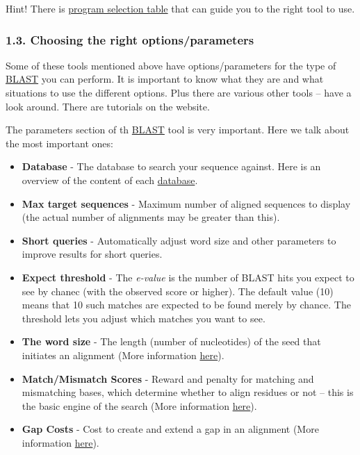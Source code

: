 \documentclass[]{article}
\begin{document}
Hint! There is
\href{http://blast.ncbi.nlm.nih.gov/Blast.cgi?CMD=Web\&PAGE_TYPE=BlastDocs\&DOC_TYPE=ProgSelectionGuide\#pstab}{program
selection table} that can guide you to the right tool to use.

\subsubsection{1.3. Choosing the right
options/parameters}\label{choosing-the-right-optionsparameters}

Some of these tools mentioned above have options/parameters for the type
of \href{http://blast.ncbi.nlm.nih.gov/}{BLAST} you can perform. It is
important to know what they are and what situations to use the different
options. Plus there are various other tools -- have a look around. There
are tutorials on the website.

The parameters section of th
\href{http://blast.ncbi.nlm.nih.gov/}{BLAST} tool is very important.
Here we talk about the most important ones:

\begin{itemize}
\itemsep1pt\parskip0pt
\item
  \textbf{Database} - The database to search your sequence against. Here
  is an overview of the content of each
  \href{http://blast.ncbi.nlm.nih.gov/Blast.cgi?CMD=Web\&PAGE_TYPE=BlastDocs\&DOC_TYPE=ProgSelectionGuide\#db}{database}.
\item
  \textbf{Max target sequences} - Maximum number of aligned sequences to
  display (the actual number of alignments may be greater than this).
\item
  \textbf{Short queries} - Automatically adjust word size and other
  parameters to improve results for short queries.
\item
  \textbf{Expect threshold} - The \emph{e-value} is the number of BLAST
  hits you expect to see by chanec (with the observed score or higher).
  The default value (10) means that 10 such matches are expected to be
  found merely by chance. The threshold lets you adjust which matches
  you want to see.
\item
  \textbf{The word size} - The length (number of nucleotides) of the
  seed that initiates an alignment (More information
  \href{http://www.ncbi.nlm.nih.gov/BLAST/blastcgihelp.shtml\#wordsize}{here}).
\item
  \textbf{Match/Mismatch Scores} - Reward and penalty for matching and
  mismatching bases, which determine whether to align residues or not --
  this is the basic engine of the search (More information
  \href{http://www.ncbi.nlm.nih.gov/BLAST/blastcgihelp.shtml\#Reward-penalty}{here}).
\item
  \textbf{Gap Costs} - Cost to create and extend a gap in an alignment
  (More information
  \href{http://www.ncbi.nlm.nih.gov/BLAST/blastcgihelp.shtml\#Reward-penalty}{here}).
\end{itemize}
\end{document}
